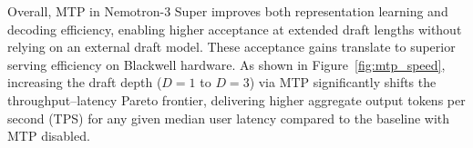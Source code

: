 Overall, MTP in Nemotron-3 Super improves both representation learning and decoding efficiency, enabling higher acceptance at extended draft lengths without relying on an external draft model. 
These acceptance gains translate to superior serving efficiency on Blackwell hardware. As shown in Figure~\ref{fig:mtp_speed}, increasing the draft depth ($D=1$ to $D=3$) via MTP significantly shifts the throughput--latency Pareto frontier, delivering higher aggregate output tokens per second (TPS) for any given median user latency compared to the baseline with MTP disabled. %










